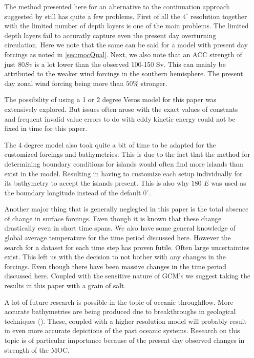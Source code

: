 The method presented here for an alternative to the continuation approach suggested by \cite{Mulder2017Jul} still has quite a few problems. First of all the $4^{\circ}$ resolution together with the limited number of depth layers is one of the main problems. The limited depth layers fail to accuratly capture even the present day overturning circulation. Here we note that the same can be said for a model with present day forcings as noted in \cref{sec:mocQual}. Next, we also note that an ACC strength of just $80 Sv$ is a lot lower than the observed 100-150 Sv. This can mainly be attributed to the weaker wind forcings in the southern hemisphere. The present day zonal wind forcing being more than $50 \%$ stronger.

The possibility of using a 1 or 2 degree Veros model for this paper was extensively explored. But issues often arose with the exact values of constants and frequent invalid value errors to do with eddy kinetic energy could not be fixed in time for this paper.

The 4 degree model also took quite a bit of time to be adapted for the customized forcings and bathymetries. This is due to the fact that the method for determining boundary conditions for islands would often find more islands than exist in the model. Resulting in having to customize each setup individually for its bathymetry to accept the islands present. This is also why $180^{\circ} E$ was used as the boundary longitude instead of the default $0^{\circ}$. 

Another major thing that is generally neglegted in this paper is the total absence of change in surface forcings. Even though it is known that these change drastically even in short time spans. We also have some general knowledge of global average temperature for the time period discussed here. However the search for a dataset for each time step has proven futile. Often large uncertainties exist. This left us with the decision to not bother with any changes in the forcings. Even though there have been massive changes in the time period discussed here. Coupled with the sensitive nature of GCM's we suggest taking the results in this paper with a grain of salt. 

A lot of future research is possible in the topic of oceanic throughflow. More accurate bathymetries are being produced due to breakthroughs in geological techniques (\cite{Baatsen2016Aug}). These, coupled with a higher resolution model will probably result in even more accurate depictions of the past oceanic systems. Research on this topic is of particular importance because of the present day observed changes in strength of the MOC.